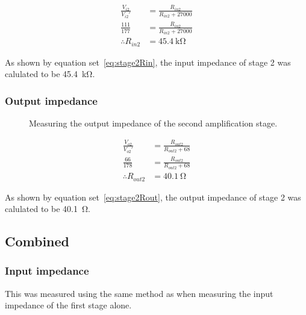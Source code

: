 \documentclass[a4paper,11pt]{article}
\begin{document}
            \begin{subequations} \label{eq:stage2Rin}
            \begin{align}
                \frac{V_{i2}}{V_{i2}'} &= \frac{R_{in2}}{R_{in2} + 27000}   \\
                \frac{111}{177} &= \frac{R_{in2}}{R_{in2} + 27000}   \\
                \therefore R_{in2} &= \SI{45.4}{\kilo\ohm}
            \end{align}
            \end{subequations}
            
            As shown by equation set~\ref{eq:stage2Rin}, the input impedance of stage 2 was calulated to be \SI{45.4}{\kilo\ohm}.
    
        \subsubsection{Output impedance}
            \begin{figure}[h]
            \centering
                
                \caption{Measuring the output impedance of the second amplification stage.}
                \label{fig:stage2outputZ}
            \end{figure}
            
            \begin{subequations} \label{eq:stage2Rout}
            \begin{align}
                \frac{V_{o2}}{V_{o2}'} &= \frac{R_{out2}}{R_{out2} + 68}   \\
                \frac{66}{178} &= \frac{R_{out2}}{R_{out2} + 68}   \\
                \therefore R_{out2} &= \SI{40.1}{\ohm}
            \end{align}
            \end{subequations}
            
            As shown by equation set~\ref{eq:stage2Rout}, the output impedance of stage 2 was calulated to be \SI{40.1}{\ohm}.
            
    \subsection{Combined}
        \subsubsection{Input impedance}
            This was measured using the same method as when measuring the input impedance of the first stage alone.
            
\end{document}
